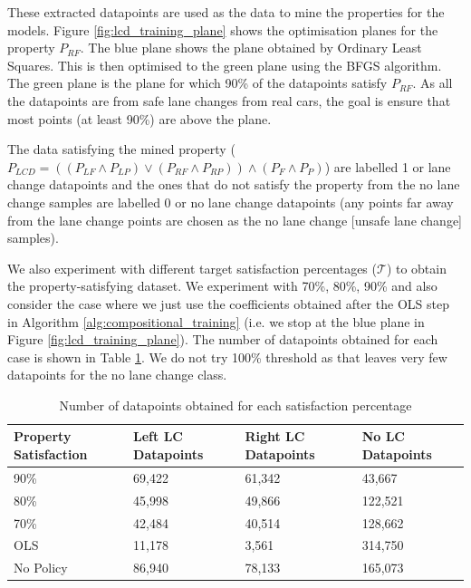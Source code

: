 These extracted datapoints are used as the data to mine the properties for the models. Figure \ref{fig:lcd_training_plane} shows the optimisation planes for the property $P_{RF}$. The blue plane shows the plane obtained by Ordinary Least Squares. This is then optimised to the green plane using the BFGS algorithm. The green plane is the plane for which 90\% of the datapoints satisfy $P_{RF}$. As all the datapoints are from safe lane changes from real cars, the goal is ensure that most points (at least 90\%) are above the plane. 

The data satisfying the mined property ($ P_{LCD} = ((P_{LF} \land P_{LP}) \lor (P_{RF} \land P_{RP})) \land (P_{F} \land P_{P}) $) are labelled 1 or lane change datapoints and the ones that do not satisfy the property from the no lane change samples are labelled 0 or no lane change datapoints (any points far away from the lane change points are chosen as the no lane change [unsafe lane change] samples). 

We also experiment with different target satisfaction percentages ($\mathcal{T}$) to obtain the property-satisfying dataset. We experiment with 70\%, 80\%, 90\% and also consider the case where we just use the coefficients obtained after the OLS step in Algorithm \ref{alg:compositional_training} (i.e. we stop at the blue plane in Figure \ref{fig:lcd_training_plane}). The number of datapoints obtained for each case is shown in Table \ref{tab:datapoints}. We do not try 100\% threshold as that leaves very few datapoints for the no lane change class. 

\begin{table}
    \centering
    \caption{Number of datapoints obtained for each satisfaction percentage}
    \begin{tabular}{|p{3cm}|p{3cm}|p{3cm}|p{3cm}|}
    \hline
    Property Satisfaction & Left LC Datapoints & Right LC Datapoints & No LC Datapoints \\
    \hline
    90\% & 69,422 & 61,342 & 43,667 \\
    80\% & 45,998 & 49,866 & 122,521 \\
    70\% & 42,484 & 40,514 & 128,662 \\
    OLS & 11,178 & 3,561 & 314,750 \\
    No Policy & 86,940 & 78,133 & 165,073 \\
    \hline
    \end{tabular}
    \label{tab:datapoints}
\end{table}

